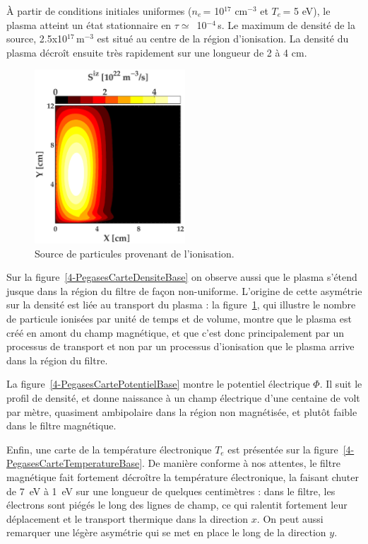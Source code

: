 \begin{refsection}
À partir de conditions initiales uniformes ($n_e\,$= 10$^{17}$ cm$^{-3}$ et
$T_e\,$= 5 eV), le plasma atteint un état stationnaire en $\tau\simeq\,$
10$^{-4}\,$s.
Le maximum de densité de la source, 2.5x10$^{17}\,$m$^{-3}$ est situé au
centre de la région d'ionisation. La densité du plasma décroît ensuite très
rapidement sur une longueur de 2 à 4 cm. 

\begin{figure}[!htbp]\centering
\includegraphics[height=6.5cm]{figures/4-PegasesCarteSourceBase.eps}
\caption{Source de particules provenant de l'ionisation.}
\label{4-PegasesCarteSourceBase}
\end{figure}

Sur la figure~\ref{4-PegasesCarteDensiteBase} on
observe aussi que le plasma s'étend jusque dans la région du filtre de façon
non-uniforme. L'origine de cette asymétrie sur la densité est liée
au transport du plasma : la figure~\ref{4-PegasesCarteSourceBase}, qui illustre
le nombre de particule ionisées par unité de temps et de volume, montre
que le plasma est créé en amont du champ magnétique, et que c'est donc principalement par un
processus de transport et non par un processus d'ionisation que le plasma arrive dans la région du
filtre.

La figure~\ref{4-PegasesCartePotentielBase} montre le potentiel
électrique $\Phi$. Il suit le profil de densité, et donne naissance à un champ
électrique d'une centaine de volt par mètre, quasiment ambipolaire dans la
région non magnétisée, et plutôt faible dans le filtre magnétique.

Enfin, une carte de la température électronique $T_e$ est présentée sur la
figure~\ref{4-PegasesCarteTemperatureBase}. De manière conforme à nos attentes,
le filtre magnétique fait fortement décroître la température électronique, la
faisant chuter de 7~eV à 1~eV sur une longueur de quelques centimètres : dans le
filtre, les électrons sont piégés le long des lignes de champ, ce qui
ralentit fortement leur déplacement et le transport
thermique dans la direction $x$.
On peut aussi remarquer une légère asymétrie qui se met en place le long de la
direction $y$.


\end{refsection}

